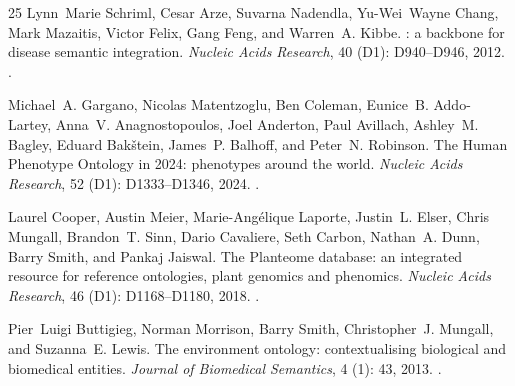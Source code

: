 \documentclass[10pt]{article}
\theoremstyle{accentdef}
\begin{document}
\begin{thebibliography}{25}
Lynn~Marie Schriml, Cesar Arze, Suvarna Nadendla, Yu-Wei~Wayne Chang, Mark
  Mazaitis, Victor Felix, Gang Feng, and Warren~A. Kibbe.
: a backbone for disease semantic integration.
\newblock \emph{Nucleic Acids Research}, 40 (D1): D940--D946,
  2012.
\newblock {}.

Michael~A. Gargano, Nicolas Matentzoglu, Ben Coleman, Eunice~B. Addo-Lartey,
  Anna~V. Anagnostopoulos, Joel Anderton, Paul Avillach, Ashley~M. Bagley,
  Eduard Bak\v{s}tein, James~P. Balhoff, and Peter~N. Robinson.
\newblock The {Human Phenotype Ontology} in 2024: phenotypes around the world.
\newblock \emph{Nucleic Acids Research}, 52 (D1):
  D1333--D1346, 2024.
\newblock {}.

Laurel Cooper, Austin Meier, Marie-Ang{\'e}lique Laporte, Justin~L. Elser,
  Chris Mungall, Brandon~T. Sinn, Dario Cavaliere, Seth Carbon, Nathan~A. Dunn,
  Barry Smith, and Pankaj Jaiswal.
\newblock The {Planteome} database: an integrated resource for reference
  ontologies, plant genomics and phenomics.
\newblock \emph{Nucleic Acids Research}, 46 (D1):
  D1168--D1180, 2018.
\newblock {}.

Pier~Luigi Buttigieg, Norman Morrison, Barry Smith, Christopher~J. Mungall, and
  Suzanna~E. Lewis.
\newblock The environment ontology: contextualising biological and biomedical
  entities.
\newblock \emph{Journal of Biomedical Semantics}, 4 (1): 43,
  2013.
\newblock {}.


\end{thebibliography}
\end{document}

